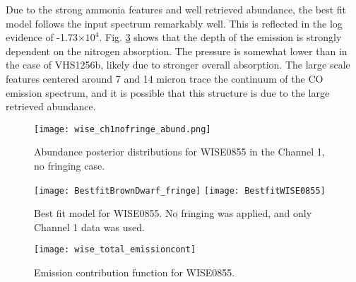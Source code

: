 Due to the strong ammonia features and well retrieved abundance, the best fit model follows the input spectrum remarkably well.
This is reflected in the log evidence of -1.73$\times10^{4}$.
Fig. \ref{fig:WISEemcont} shows that the depth of the emission is strongly dependent on the nitrogen absorption. 
The pressure is somewhat lower than in the case of VHS1256b, likely due to stronger overall absorption. 
The large scale features centered around 7 and 14 micron trace the continuum of the CO emission spectrum, and it is possible that this structure is due to the large retrieved abundance.
\begin{figure}[h]
	\texttt{[image: wise\_ch1nofringe\_abund.png]}
	\caption{Abundance posterior distributions for WISE0855 in the Channel 1, no fringing case.}
	\label{fig:postWISEabund}
\end{figure}
\begin{figure}[h]
	\texttt{[image: BestfitBrownDwarf\_fringe]}
	\texttt{[image: BestfitWISE0855]}
	\caption{Best fit model for WISE0855. No fringing was applied, and only Channel 1 data was used.}
	\label{fig:bestfitWISE}
\end{figure}
\begin{figure}[h]
	\texttt{[image: wise\_total\_emissioncont]}
	\caption{Emission contribution function for WISE0855.}
	\label{fig:WISEemcont}
\end{figure}
\clearpage

